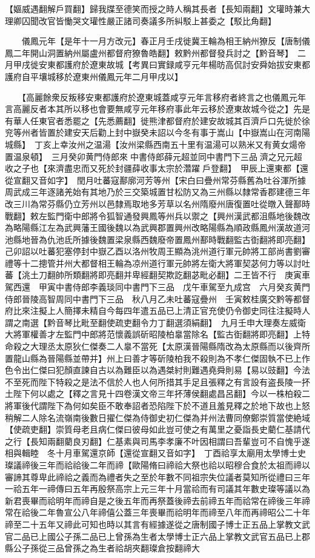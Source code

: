 【嫗威遇翻解戶買翻】歸我牒至德笑而授之時人稱其長者【長知兩翻】文瓘時兼大理卿囚聞改官皆慟哭文瓘性嚴正諸司奏議多所糾駁上甚委之【駁比角翻】

　　儀鳳元年【是年十一月方改元】春正月壬戌徙冀王輪為相王納州獠反【唐制儀鳳二年開山洞置納州屬盧州都督府獠魯皓翻】敕黔州都督發兵討之【黔音琴】　二月甲戌徙安東都護府於遼東故城【考異曰實録咸亨元年楊昉高侃討安舜始拔安東都護府自平壤城移於遼東州儀鳳元年二月甲戌以】

　　【高麗餘衆反叛移安東都護府於遼東城蓋咸亨元年言移府者終言之也儀鳳元年言高麗反者本其所以移也會要無咸亨元年移府事此年云移於遼東故城今從之】先是有華人任東官者悉罷之【先悉薦翻】徙熊津都督府於建安故城其百濟戶口先徙於徐兖等州者皆置於建安天后勸上封中嶽癸未詔以今冬有事于嵩山【中嶽嵩山在河南陽城縣】　丁亥上幸汝州之温湯【汝州梁縣西南五十里有温湯可以熟米又有黄女煬帝置温泉頓】　三月癸卯黄門侍郎來中書侍郎薛元超並同中書門下三品濟之兄元超收之子也【來濟盡忠而又死於封疆薛收事太宗於濳躍戶登翻】　甲辰上還東都【還從宣翻又音如字】　閏月吐蕃寇鄯廓河芳等州【宋白曰疊州常芬縣舊為吐谷渾所據周武成三年逐諸羌始有其地乃於三交築城置甘松防又為三州縣以隸常香郡建德三年改三川為常芬縣仍立芳州以邑隸焉取地多芳草以名州隋廢州唐復置吐從暾入聲鄯時戰翻】敕左監門衛中郎將令狐智通發興鳳等州兵以禦之【興州漢武都沮縣地後魏改為略陽縣江左為武興藩王國後魏以為武興郡置興州改略陽縣為順政縣鳳州漢故道河池縣地晉為仇池氐所據後魏置梁泉縣西魏廢帝置鳳州鄯時戰翻監古衘翻將即亮翻】己卯詔以吐蕃犯塞停封中嶽乙酉以洛州牧周王顯為洮州道行軍元帥將工部尚書劉審禮等十二摠管并州大都督相王輪為凉州道行軍元帥將左衛大將軍契苾何力等以討吐蕃【洮土刀翻帥所類翻將即亮翻并卑經翻契欺訖翻苾毗必翻】二王皆不行　庚寅車駕西還　甲寅中書侍郎李義琰同中書門下三品　戊午車駕至九成宫　六月癸亥黄門侍郎晉陵高智周同中書門下三品　秋八月乙未吐蕃寇疊州　壬寅敕桂廣交黔等都督府比來注擬上人簡擇未精自今每四年遣五品已上清正官充使仍令御史同往注擬時人謂之南選【黔音琴比毗至翻使疏吏翻令力丁翻選須絹翻】　九月壬申大理奏左威衛大將軍權善才左監門中郎將范懷義誤斫昭陵柏辠當除名【監古衘翻將即亮翻】上特命殺之大理丞太原狄仁傑奏二人辠不當死【太原漢晉陽縣隋改為太原縣而以後齊所置龍山縣為晉陽縣並帶并】州上曰善才等斫陵柏我不殺則為不孝仁傑固執不已上作色令出仁傑曰犯顏直諫自古以為難臣以為遇桀紂則難遇堯舜則易【易以豉翻】今法不至死而陛下特殺之是法不信於人也人何所措其手足且張釋之有言設有盗長陵一抔土陛下何以處之【釋之言見十四卷漢文帝三年抔薄侯翻處昌呂翻】今以一株柏殺二將軍後代謂陛下為何如矣臣不敢奉詔者恐陷陛下於不道且羞見釋之於地下故也上怒稍解二人除名流嶺南後數日擢仁傑為侍御史初仁傑為并州法曹同僚鄭崇質當使絶域【使疏吏翻】崇質母老且病仁傑曰彼母如此豈可使之有萬里之憂詣長史藺仁基請代之行【長知兩翻藺良刃翻】仁基素與司馬李孝廉不叶因相謂曰吾輩豈可不自愧乎遂相與輯睦　冬十月車駕還京師【還從宣翻又音如字】　丁酉祫享太廟用太學博士史璨議禘後三年而祫祫後二年而禘【歐陽脩曰禘祫大祭也祫以昭穆合食於太祖而禘以審諦其尊卑此禘祫之義而為禮者失之至於年數不同祖宗失位議者莫知所從禮曰三年一祫五年一禘傳曰五年再殷祭高宗上元三年十月當祫而有司議其年數史璨等議以為新君喪畢而祫明年而禘自是之後五年而再祭蓋後禘去前禘五年而祫常在禘後三年禘常在祫後二年魯宣公八年禘僖公蓋三年喪畢而祫明年而禘至八年而再禘昭公二十年禘至二十五年又禘此可知也時以其言有經據遂從之唐制國子博士正五品上掌教文武官二品已上國公子孫二品已上曾孫為生者太學博士正六品上掌教文武官五品已上郡縣公子孫從三品曾孫之為生者祫胡夾翻璨倉按翻禘大
